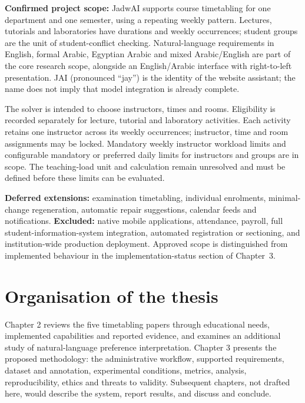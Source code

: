 \documentclass[
  11pt,a4paper,oneside]{report}
\begin{document}
\textbf{Confirmed project scope:} JadwAI supports course timetabling for one department and one semester, using a repeating weekly pattern. Lectures, tutorials and laboratories have durations and weekly occurrences; student groups are the unit of student-conflict checking. Natural-language requirements in English, formal Arabic, Egyptian Arabic and mixed Arabic/English are part of the core research scope, alongside an English/Arabic interface with right-to-left presentation. JAI (pronounced ``jay'') is the identity of the website assistant; the name does not imply that model integration is already complete.

The solver is intended to choose instructors, times and rooms. Eligibility is recorded separately for lecture, tutorial and laboratory activities. Each activity retains one instructor across its weekly occurrences; instructor, time and room assignments may be locked. Mandatory weekly instructor workload limits and configurable mandatory or preferred daily limits for instructors and groups are in scope. The teaching-load unit and calculation remain unresolved and must be defined before these limits can be evaluated.

\textbf{Deferred extensions:} examination timetabling, individual enrolments, minimal-change regeneration, automatic repair suggestions, calendar feeds and notifications. \textbf{Excluded:} native mobile applications, attendance, payroll, full student-information-system integration, automated registration or sectioning, and institution-wide production deployment. Approved scope is distinguished from implemented behaviour in the implementation-status section of Chapter~3.

\hypertarget{organisation-of-the-thesis}{%
\section{Organisation of the thesis}\label{organisation-of-the-thesis}}

Chapter 2 reviews the five timetabling papers through educational needs, implemented capabilities and reported evidence, and examines an additional study of natural-language preference interpretation. Chapter 3 presents the
proposed methodology: the administrative workflow, supported requirements,
dataset and annotation, experimental conditions, metrics, analysis,
reproducibility, ethics and threats to validity. Subsequent chapters,
not drafted here, would describe the system, report results, and discuss
and conclude.
\end{document}
